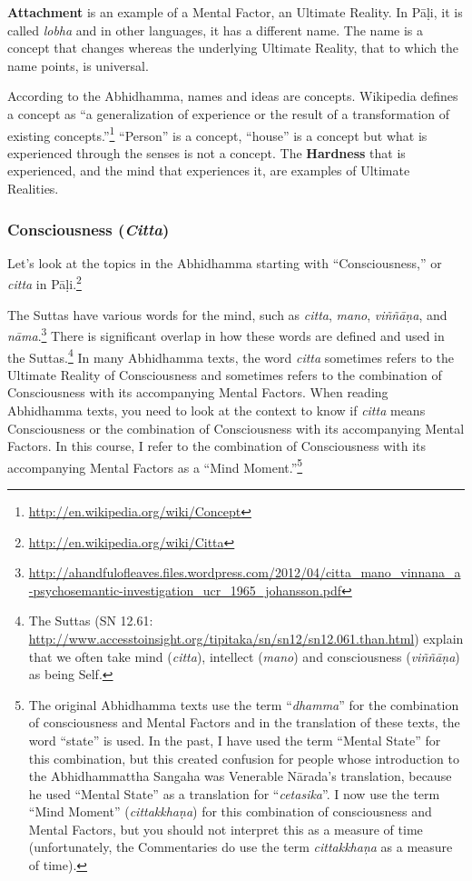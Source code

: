 \textbf{Attachment} is an example of a Mental Factor, an Ultimate Reality. In Pāḷi, it is called \textit{lobha} and in other languages, it has a different name. The name is a concept that changes whereas the underlying Ultimate Reality, that to which the name points, is universal.

\pagebreak

According to the Abhidhamma, names and ideas are concepts. Wikipedia defines a concept as “a generalization of experience or the result of a transformation of existing concepts.”\footnote{\url{http://en.wikipedia.org/wiki/Concept}} “Person” is a concept, “house” is a concept but what is experienced through the senses is not a concept. The \textbf{Hardness} that is experienced, and the mind that experiences it, are examples of Ultimate Realities.

\subsubsection*{Consciousness (\textit{Citta})}

Let’s look at the topics in the Abhidhamma starting with “Consciousness,” or \textit{citta} in Pāḷi.\footnote{\url{http://en.wikipedia.org/wiki/Citta}}

The Suttas have various words for the mind, such as \textit{citta}, \textit{mano}, \textit{viññāṇa}, and \textit{nāma}.\footnote{\url{http://ahandfulofleaves.files.wordpress.com/2012/04/citta_mano_vinnana_a-psychosemantic-investigation_ucr_1965_johansson.pdf}} There is significant overlap in how these words are defined and used in the Suttas.\footnote{The Suttas (SN 12.61: \url{http://www.accesstoinsight.org/tipitaka/sn/sn12/sn12.061.than.html}) explain that we often take mind (\textit{citta}), intellect (\textit{mano}) and consciousness (\textit{viññāṇa}) as being Self.} In many Abhidhamma texts, the word \textit{citta} sometimes refers to the Ultimate Reality of Consciousness and sometimes refers to the combination of Consciousness with its accompanying Mental Factors. When reading Abhidhamma texts, you need to look at the context to know if \textit{citta} means Consciousness or the combination of Consciousness with its accompanying Mental Factors. In this course, I refer to the combination of Consciousness with its accompanying Mental Factors as a “Mind Moment.”\footnote{The original Abhidhamma texts use the term “\textit{dhamma}” for the combination of consciousness and Mental Factors and in the translation of these texts, the word “state” is used. In the past, I have used the term “Mental State” for this combination, but this created confusion for people whose introduction to the Abhidhammattha Sangaha was Venerable Nārada’s translation, because he used “Mental State” as a translation for “\textit{cetasika}”. I now use the term “Mind Moment” (\textit{cittakkhaṇa}) for this combination of consciousness and Mental Factors, but you should not interpret this as a measure of time (unfortunately, the Commentaries do use the term \textit{cittakkhaṇa} as a measure of time).} 

